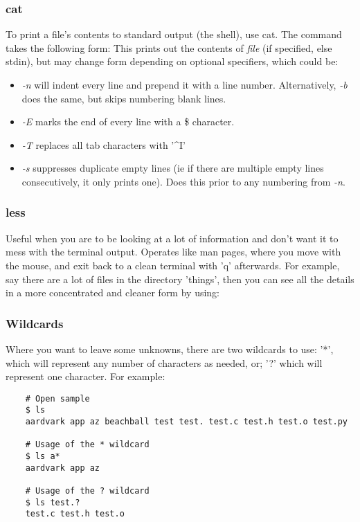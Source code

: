 \documentclass{article}
\begin{document}
\subsubsection{cat}
To print a file's contents to standard output (the shell), use cat. The command takes the following form:
This prints out the contents of \textit{file} (if specified, else stdin), but may change form depending on optional specifiers, which could be:
\begin{itemize}
    \item \textit{-n} will indent every line and prepend it with a line number. Alternatively, \textit{-b} does the same, but skips numbering blank lines.
    \item \textit{-E} marks the end of every line with a \$ character.
    \item \textit{-T} replaces all tab characters with '\^{}I'
    \item \textit{-s} suppresses duplicate empty lines (ie if there are multiple empty lines consecutively, it only prints one). Does this prior to any numbering from \textit{-n}.
\end{itemize}

\subsubsection{less}
Useful when you are to be looking at a lot of information and don't want it to mess with the terminal output. Operates like man pages, where you move with the mouse, and exit back to a clean terminal with 'q' afterwards. For example, say there are a lot of files in the directory 'things', then you can see all the details in a more concentrated and cleaner form by using:

\subsubsection{Wildcards}
Where you want to leave some unknowns, there are two wildcards to use: '*', which will represent any number of characters as needed, or; '?' which will represent one character. For example:
\begin{verbatim}
    # Open sample
    $ ls
    aardvark app az beachball test test. test.c test.h test.o test.py
    
    # Usage of the * wildcard
    $ ls a*
    aardvark app az

    # Usage of the ? wildcard
    $ ls test.?
    test.c test.h test.o
\end{verbatim}
\end{document}
